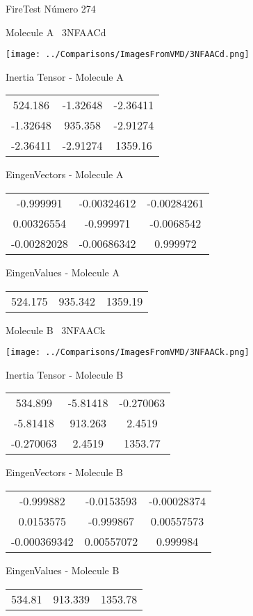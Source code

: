 \vtab[-3cm]
\begin{center}
{\large FireTest \tab Número 274}
\end{center}
\begin{multicols}{2}
\begin{center}

Molecule A \
3NFAACd

\texttt{[image: ../Comparisons/ImagesFromVMD/3NFAACd.png]}

Inertia Tensor - Molecule A \\
\begin{tabular}{|c c c|}
524.186	 & 	-1.32648	 & 	-2.36411	 \\
-1.32648	 & 	935.358	 & 	-2.91274	 \\
-2.36411	 & 	-2.91274	 & 	1359.16
\end{tabular}

\vtab
 EingenVectors - Molecule A     \\
\begin{tabular}{|c c c|}
-0.999991	 & 	-0.00324612	 & 	-0.00284261	 \\
0.00326554	 & 	-0.999971	 & 	-0.0068542	 \\
-0.00282028	 & 	-0.00686342	 & 	0.999972
\end{tabular}

\vtab
 EingenValues - Molecule A     \\
\begin{tabular}{|c c c|}
524.175	 & 	935.342	 & 	1359.19	 \\
\end{tabular}
\columnbreak

Molecule B \
3NFAACk

\texttt{[image: ../Comparisons/ImagesFromVMD/3NFAACk.png]}

Inertia Tensor - Molecule B \\
\begin{tabular}{|c c c|}
534.899	 & 	-5.81418	 & 	-0.270063	 \\
-5.81418	 & 	913.263	 & 	2.4519	 \\
-0.270063	 & 	2.4519	 & 	1353.77
\end{tabular}

\vtab
 EingenVectors - Molecule B     \\
\begin{tabular}{|c c c|}
-0.999882	 & 	-0.0153593	 & 	-0.00028374	 \\
0.0153575	 & 	-0.999867	 & 	0.00557573	 \\
-0.000369342	 & 	0.00557072	 & 	0.999984
\end{tabular}

\vtab
 EingenValues - Molecule B     \\
\begin{tabular}{|c c c|}
534.81	 & 	913.339	 & 	1353.78	 \\
\end{tabular}

\end{center}
\end{multicols}

